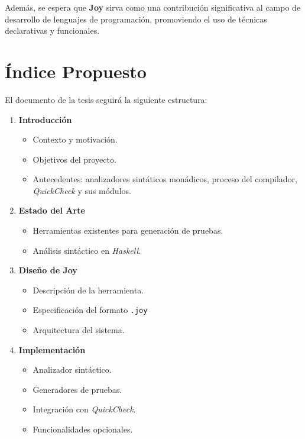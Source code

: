 \documentclass[11pt]{article}
\begin{document}
Además, se espera que \textbf{Joy} sirva como una contribución significativa al campo de desarrollo de lenguajes de programación, promoviendo el uso de técnicas declarativas y funcionales.

\section*{Índice Propuesto}

El documento de la tesis seguirá la siguiente estructura:

\begin{enumerate}
\item \textbf{Introducción}
  
  \begin{itemize}
  \item Contexto y motivación.
  \item Objetivos del proyecto.
  \item Antecedentes: analizadores sintáticos monádicos, proceso del compilador, \textit{QuickCheck} y sus módulos.
  \end{itemize}

\item \textbf{Estado del Arte}

  \begin{itemize}
  \item Herramientas existentes para generación de pruebas.
  \item Análisis sintáctico en \textit{Haskell}.
  \end{itemize}

\item \textbf{Diseño de Joy}

  \begin{itemize}
  \item Descripción de la herramienta.
  \item Especificación del formato \texttt{.joy}
  \item Arquitectura del sistema.
  \end{itemize}

\item \textbf{Implementación}

  \begin{itemize}
  \item Analizador sintáctico.
  \item Generadores de pruebas.
  \item Integración con \textit{QuickCheck}.
  \item Funcionalidades opcionales.
  \end{itemize}
  

\end{enumerate}
\end{document}
